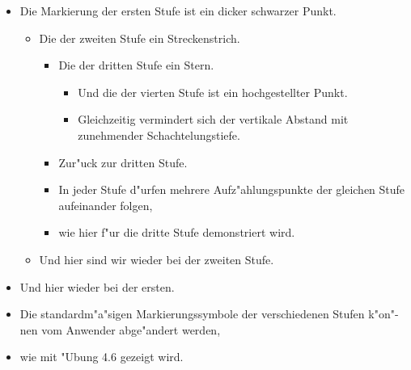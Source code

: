 \documentclass{article}
\begin{document}
\begin{itemize}
\item Die Markierung der ersten Stufe ist ein dicker schwarzer Punkt.
\begin{itemize}
\item Die der zweiten Stufe ein Streckenstrich.
\begin{itemize}
\item Die der dritten Stufe ein Stern.
\begin{itemize}
\item Und die der vierten Stufe ist ein hochgestellter Punkt.
\item Gleichzeitig vermindert sich der vertikale Abstand mit
      zunehmender Schachtelungstiefe.
\end{itemize}
\item Zur"uck zur dritten Stufe.
\item In jeder Stufe d"urfen mehrere Aufz"ahlungspunkte der gleichen
      Stufe aufeinander folgen,
\item wie hier f"ur die dritte Stufe demonstriert wird.
\end{itemize}
\item Und hier sind wir wieder bei der zweiten Stufe.
\end{itemize}
\item Und hier wieder bei der ersten.
\item Die standardm"a"sigen Markierungssymbole der verschiedenen
     Stufen k"on"-nen vom Anwender abge"andert werden,
\item wie mit "Ubung 4.6 gezeigt wird.
\end{itemize}
\end{document}
